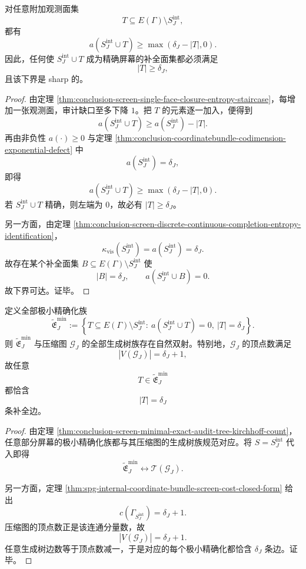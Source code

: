 \begin{theorem}\label{thm:conclusion-coordinatebundle-arbitrary-completion-sharp-lower-bound}
对任意附加观测面集
\[
T\subseteq E(\Gamma)\setminus S_J^{\mathrm{int}},
\]
都有
\[
a(S_J^{\mathrm{int}}\cup T)\ge \max(\delta_J-|T|,0).
\]
因此，任何使 \(S_J^{\mathrm{int}}\cup T\) 成为精确屏幕的补全面集都必须满足
\[
|T|\ge \delta_J,
\]
且该下界是 sharp 的。
\end{theorem}
\begin{proof}
由定理 \ref{thm:conclusion-screen-single-face-closure-entropy-staircase}，每增加一张观测面，审计缺口至多下降 \(1\)。把 \(T\) 的元素逐一加入，便得到
\[
a(S_J^{\mathrm{int}}\cup T)\ge a(S_J^{\mathrm{int}})-|T|.
\]
再由非负性 \(a(\cdot)\ge 0\) 与定理 \ref{thm:conclusion-coordinatebundle-codimension-exponential-defect} 中
\[
a(S_J^{\mathrm{int}})=\delta_J,
\]
即得
\[
a(S_J^{\mathrm{int}}\cup T)\ge \max(\delta_J-|T|,0).
\]
若 \(S_J^{\mathrm{int}}\cup T\) 精确，则左端为 \(0\)，故必有 \(|T|\ge \delta_J\)。

另一方面，由定理 \ref{thm:conclusion-screen-discrete-continuous-completion-entropy-identification}，
\[
\kappa_{\mathrm{vis}}(S_J^{\mathrm{int}})=a(S_J^{\mathrm{int}})=\delta_J.
\]
故存在某个补全面集 \(B\subseteq E(\Gamma)\setminus S_J^{\mathrm{int}}\) 使
\[
|B|=\delta_J,
\qquad
a(S_J^{\mathrm{int}}\cup B)=0.
\]
故下界可达。证毕。
\end{proof}

\begin{theorem}[内部坐标束屏幕的全部极小精确化与压缩图生成树完全等价]\label{thm:conclusion-coordinatebundle-all-minimal-exactifications-spanning-trees}
定义全部极小精确化族
\[
\widetilde{\mathfrak E}_J^{\min}
:=
\left\{
T\subseteq E(\Gamma)\setminus S_J^{\mathrm{int}}:\ 
a(S_J^{\mathrm{int}}\cup T)=0,\ |T|=\delta_J
\right\}.
\]
则 \(\widetilde{\mathfrak E}_J^{\min}\) 与压缩图 \(\mathcal G_J\) 的全部生成树族存在自然双射。特别地，\(\mathcal G_J\) 的顶点数满足
\[
|V(\mathcal G_J)|=\delta_J+1,
\]
故任意
\[
T\in \widetilde{\mathfrak E}_J^{\min}
\]
都恰含
\[
|T|=\delta_J
\]
条补全边。
\end{theorem}
\begin{proof}
由定理 \ref{thm:conclusion-screen-minimal-exact-audit-tree-kirchhoff-count}，任意部分屏幕的极小精确化族都与其压缩图的生成树族规范对应。将 \(S=S_J^{\mathrm{int}}\) 代入即得
\[
\widetilde{\mathfrak E}_J^{\min}
\longleftrightarrow
\mathcal T(\mathcal G_J).
\]

另一方面，定理 \ref{thm:spg-internal-coordinate-bundle-screen-cost-closed-form} 给出
\[
c(\Gamma_{S_J^{\mathrm{int}}})=\delta_J+1.
\]
压缩图的顶点数正是该连通分量数，故
\[
|V(\mathcal G_J)|=\delta_J+1.
\]
任意生成树边数等于顶点数减一，于是对应的每个极小精确化都恰含 \(\delta_J\) 条边。证毕。
\end{proof}

